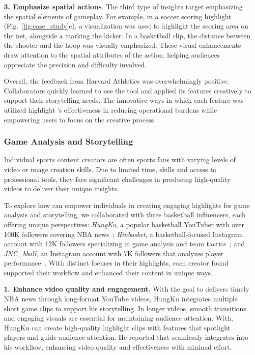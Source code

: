 \textbf{3. Emphasize spatial actions}. The third type of insights target emphasizing the spatial elements of gameplay. For example, in a soccer scoring highlight (Fig.~\ref{fig:case_study}c), a \Zone{} visualization was used to highlight the scoring area on the net, alongside a \Circle{} marking the kicker. In a basketball clip, the distance between the shooter and the hoop was visually emphasized. These visual enhancements draw attention to the spatial attributes of the action, helping audiences appreciate the precision and difficulty involved.


Overall, the feedback from Harvard Athletics was overwhelmingly positive. Collaborators quickly learned to use the tool and applied its features creatively to support their storytelling needs. The innovative ways in which each feature was utilized highlight \SB{}'s effectiveness in reducing operational burdens while empowering users to focus on the creative process.


\subsubsection{Game Analysis and Storytelling}

Individual sports content creators are often sports fans with varying levels of video or image creation skills. Due to limited time, skills and access to professional tools, they face significant challenges in producing high-quality videos to deliver their unique insights. 

To explore how \SB{} can empower individuals in creating engaging highlights for game analysis and storytelling, we collaborated with three basketball influencers, each offering unique perspectives: \textit{HungKu}, a popular basketball YouTuber with over 100K followers covering NBA news~\cite{hungku}; \textit{Hinbasket}, a basketball-focused Instagram account with 12K followers specializing in game analysis and team tactics~\cite{hinbasket}; and \textit{JNC\_bball}, an Instagram account with 7K followers that analyzes player performance~\cite{jnc}.
With distinct focuses in their highlights, each creator found \SB{} supported their workflow and enhanced their content in unique ways. 

\textbf{1. Enhance video quality and engagement.} 
With the goal to delivers timely NBA news through long-format YouTube videos, HungKu integrates multiple short game clips to support his storytelling. In longer videos, smooth transitions and engaging visuals are essential for maintaining audience attention. With\SB{}, HungKu can create high-quality highlight clips with features that spotlight players and guide audience attention. He reported that \SB{} seamlessly integrates into his workflow, enhancing video quality and effectiveness with minimal effort.

